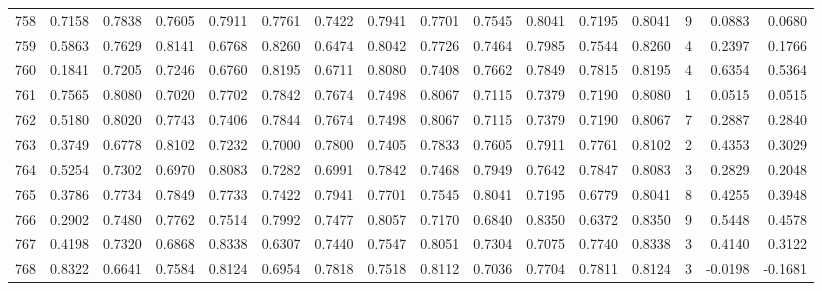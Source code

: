 \begin{tabular}{lrrrrrrrrrrrrrrr}
758 &      0.7158 &  0.7838 &  0.7605 &  0.7911 &  0.7761 &  0.7422 &  0.7941 &  0.7701 &  0.7545 &  0.8041 &   0.7195 &     0.8041 &      9 &                    0.0883 &                     0.0680 \\
759 &      0.5863 &  0.7629 &  0.8141 &  0.6768 &  0.8260 &  0.6474 &  0.8042 &  0.7726 &  0.7464 &  0.7985 &   0.7544 &     0.8260 &      4 &                    0.2397 &                     0.1766 \\
760 &      0.1841 &  0.7205 &  0.7246 &  0.6760 &  0.8195 &  0.6711 &  0.8080 &  0.7408 &  0.7662 &  0.7849 &   0.7815 &     0.8195 &      4 &                    0.6354 &                     0.5364 \\
761 &      0.7565 &  0.8080 &  0.7020 &  0.7702 &  0.7842 &  0.7674 &  0.7498 &  0.8067 &  0.7115 &  0.7379 &   0.7190 &     0.8080 &      1 &                    0.0515 &                     0.0515 \\
762 &      0.5180 &  0.8020 &  0.7743 &  0.7406 &  0.7844 &  0.7674 &  0.7498 &  0.8067 &  0.7115 &  0.7379 &   0.7190 &     0.8067 &      7 &                    0.2887 &                     0.2840 \\
763 &      0.3749 &  0.6778 &  0.8102 &  0.7232 &  0.7000 &  0.7800 &  0.7405 &  0.7833 &  0.7605 &  0.7911 &   0.7761 &     0.8102 &      2 &                    0.4353 &                     0.3029 \\
764 &      0.5254 &  0.7302 &  0.6970 &  0.8083 &  0.7282 &  0.6991 &  0.7842 &  0.7468 &  0.7949 &  0.7642 &   0.7847 &     0.8083 &      3 &                    0.2829 &                     0.2048 \\
765 &      0.3786 &  0.7734 &  0.7849 &  0.7733 &  0.7422 &  0.7941 &  0.7701 &  0.7545 &  0.8041 &  0.7195 &   0.6779 &     0.8041 &      8 &                    0.4255 &                     0.3948 \\
766 &      0.2902 &  0.7480 &  0.7762 &  0.7514 &  0.7992 &  0.7477 &  0.8057 &  0.7170 &  0.6840 &  0.8350 &   0.6372 &     0.8350 &      9 &                    0.5448 &                     0.4578 \\
767 &      0.4198 &  0.7320 &  0.6868 &  0.8338 &  0.6307 &  0.7440 &  0.7547 &  0.8051 &  0.7304 &  0.7075 &   0.7740 &     0.8338 &      3 &                    0.4140 &                     0.3122 \\
768 &      0.8322 &  0.6641 &  0.7584 &  0.8124 &  0.6954 &  0.7818 &  0.7518 &  0.8112 &  0.7036 &  0.7704 &   0.7811 &     0.8124 &      3 &                   -0.0198 &                    -0.1681 \\

\end{tabular}
